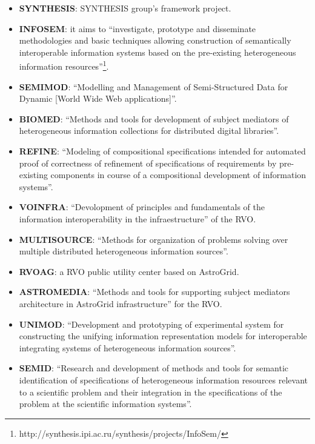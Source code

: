 \begin{itemize}
\item \textbf{SYNTHESIS}:
SYNTHESIS group's framework project.

\item \textbf{INFOSEM}:
it aims to ``investigate, prototype and disseminate methodologies and basic
techniques allowing construction of semantically interoperable information
systems based on the pre-existing heterogeneous information
resources''\footnote{http://synthesis.ipi.ac.ru/synthesis/projects/InfoSem/}.

\item \textbf{SEMIMOD}:
``Modelling and Management of Semi-Structured Data for Dynamic [World Wide Web
applications]''.

\item \textbf{BIOMED}:
``Methods and tools for development of subject mediators of
he\-te\-ro\-ge\-neous information collections for distributed digital
libraries''.

\item \textbf{REFINE}:
``Modeling of compositional specifications intended for automated proof of
correctness of refinement of specifications of requirements by pre-existing
components in course of a compositional development of information systems''.

\item \textbf{VOINFRA}:
``Devolopment of principles and fundamentals of the information interoperability
in the infraestructure'' of the RVO.

\item \textbf{MULTISOURCE}:
``Methods for organization of problems solving over multiple distributed
heterogeneous information sources''.

\item \textbf{RVOAG}:
a RVO public utility center based on AstroGrid.

\item \textbf{ASTROMEDIA}:
``Methods and tools for supporting subject mediators architecture in AstroGrid
infrastructure'' for the RVO.

\item \textbf{UNIMOD}:
``Development and prototyping of experimental system for constructing the
unifying information representation models for interoperable integrating systems
of heterogeneous information sources''.

\item \textbf{SEMID}:
``Research and development of methods and tools for semantic identification of
specifications of heterogeneous information resources relevant to a scientific
problem and their integration in the specifications of the problem at the
scientific information systems''.


\end{itemize}
